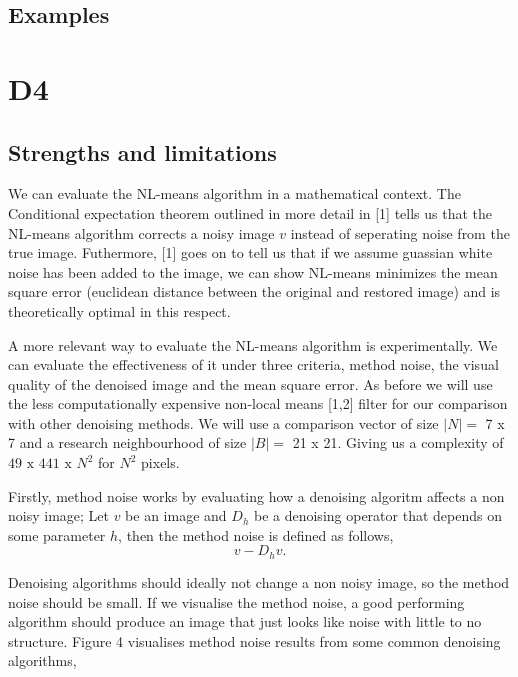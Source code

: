 \documentclass[fullpage]{article}
\begin{document}
\subsection{Examples}

\section{D4}
\subsection{Strengths and limitations}
We can evaluate the NL-means algorithm in a mathematical context. The Conditional expectation theorem outlined in more detail in [1] tells us that the NL-means algorithm corrects a noisy image $v$ instead of seperating noise from the true image. Futhermore, [1] goes on to tell us that if we assume guassian white noise has been added to the image, we can show NL-means minimizes the mean square error (euclidean distance between the original and restored image) and is theoretically optimal in this respect.

A more relevant way to evaluate the NL-means algorithm is experimentally. We can evaluate the effectiveness of it under three criteria, method noise, the visual quality of the denoised image and the mean square error. As before we will use the less computationally expensive non-local means [1,2] filter for our comparison with other denoising methods. We will use a comparison vector of size $|N| = $ 7 x 7 and a research neighbourhood of size $|B| = $ 21 x 21. Giving us a complexity of $49 \text{ x } 441 \text{ x } N^2$ for $N^2$ pixels. 

Firstly, method noise works by evaluating how a denoising algoritm affects a non noisy image; Let $v$ be an image and $D_h$ be a denoising operator that depends on some parameter $h$, then the method noise is defined as follows,
$$v - D_h v.$$

Denoising algorithms should ideally not change a non noisy image, so the method noise should be small. If we visualise the method noise, a good performing algorithm should produce an image that just looks like noise with little to no structure. Figure 4 visualises method noise results from some common denoising algorithms,
\newline
\newline
\end{document}

